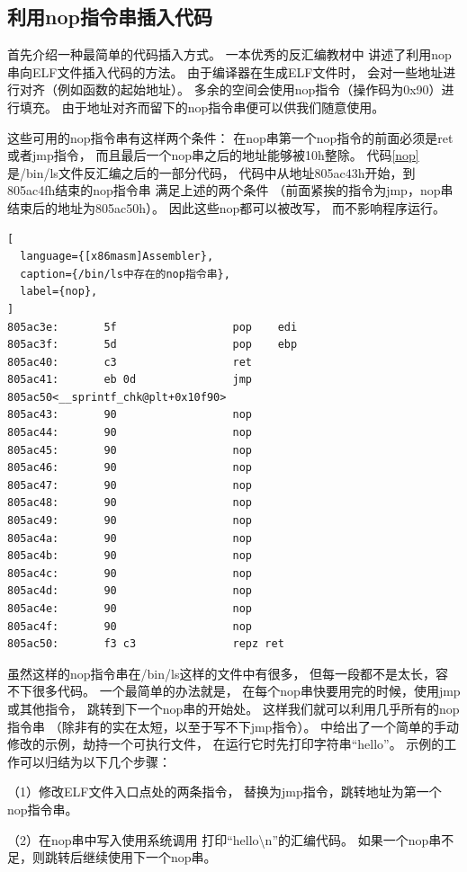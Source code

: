 \subsection{利用nop指令串插入代码}

首先介绍一种最简单的代码插入方式。
一本优秀的反汇编教材\cite{heike}中
讲述了利用nop串向ELF文件插入代码的方法。
由于编译器在生成ELF文件时，
会对一些地址进行对齐（例如函数的起始地址）。
多余的空间会使用nop指令（操作码为0x90）进行填充。
由于地址对齐而留下的nop指令串便可以供我们随意使用。

这些可用的nop指令串有这样两个条件：
在nop串第一个nop指令的前面必须是ret或者jmp指令，
而且最后一个nop串之后的地址能够被10h整除。
代码\ref{nop}是/bin/ls文件反汇编之后的一部分代码，
代码中从地址805ac43h开始，到805ac4fh结束的nop指令串
满足上述的两个条件
（前面紧挨的指令为jmp，nop串结束后的地址为805ac50h）。
因此这些nop都可以被改写，
而不影响程序运行。

\begin{lstlisting}[
  language={[x86masm]Assembler},
  caption={/bin/ls中存在的nop指令串},
  label={nop},
]
805ac3e:       5f                  pop    edi
805ac3f:       5d                  pop    ebp
805ac40:       c3                  ret
805ac41:       eb 0d               jmp    805ac50<__sprintf_chk@plt+0x10f90>
805ac43:       90                  nop
805ac44:       90                  nop
805ac45:       90                  nop
805ac46:       90                  nop
805ac47:       90                  nop
805ac48:       90                  nop
805ac49:       90                  nop
805ac4a:       90                  nop
805ac4b:       90                  nop
805ac4c:       90                  nop
805ac4d:       90                  nop
805ac4e:       90                  nop
805ac4f:       90                  nop
805ac50:       f3 c3               repz ret
\end{lstlisting}

虽然这样的nop指令串在/bin/ls这样的文件中有很多，
但每一段都不是太长，容不下很多代码。
一个最简单的办法就是，
在每个nop串快要用完的时候，使用jmp或其他指令，
跳转到下一个nop串的开始处。
这样我们就可以利用几乎所有的nop指令串
（除非有的实在太短，以至于写不下jmp指令）。
\cite{heike}中给出了一个简单的手动修改的示例，劫持一个可执行文件，
在运行它时先打印字符串“hello”。
示例的工作可以归结为以下几个步骤：

（1）修改ELF文件入口点处的两条指令，
替换为jmp指令，跳转地址为第一个nop指令串。

（2）在nop串中写入使用系统调用
打印“hello\textbackslash n”的汇编代码。
如果一个nop串不足，则跳转后继续使用下一个nop串。

